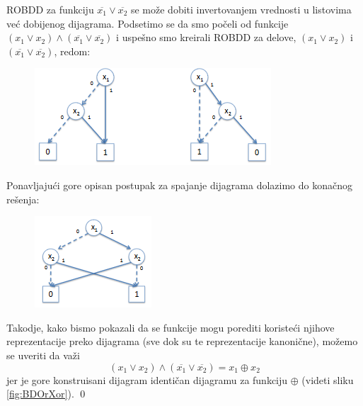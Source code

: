 \begin{exmp}
    ROBDD za funkciju $\overline{x_{1}} \vee \overline{x_{2}}$ se mo\v{z}e dobiti invertovanjem vrednosti u listovima ve\'c{} dobijenog dijagrama. Podsetimo se da smo po\v{c}eli od funkcije $(x_{1} \vee x_{2}) \wedge (\overline{x_{1}} \vee \overline{x_{2}})$ i uspe\v{s}no smo kreirali ROBDD za delove, $(x_{1} \vee x_{2})$ i $(\overline{x_{1}} \vee \overline{x_{2}})$, redom:

    \begin{figure}[H]
        \centering
        \includegraphics{slike/ROBDD_primer_9.PNG}
    \end{figure}

    Ponavljaju\'c{}i gore opisan postupak za spajanje dijagrama dolazimo do kona\v{c}nog re\v{s}enja:

    \begin{figure}[H]
        \centering
        \includegraphics{slike/ROBDD_primer_10.PNG}
    \end{figure}

    Takodje, kako bismo pokazali da se funkcije mogu porediti koriste\'c{}i njihove reprezentacije preko dijagrama (sve dok su te reprezentacije kanoni\v{c}ne), mo\v{z}emo se uveriti da va\v{z}i
    $$(x_{1} \vee x_{2}) \wedge (\overline{x_{1}} \vee \overline{x_{2}}) = x_{1} \oplus x_{2}$$
    jer je gore konstruisani dijagram identi\v{c}an dijagramu za funkciju $\oplus$ (videti sliku \ref{fig:BDOrXor}).
\qed
\end{exmp}
